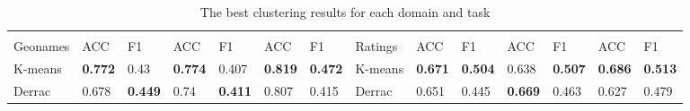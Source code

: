 \begin{landscape}
\begin{table}[]
\begin{tabular}{llllllllllllll}
&                                 &                                 &                                 &                                 &                                 &                                 &                                &                                 &                                 &                                 &                                 &                                 &                            \\
Geonames    & ACC                             & F1                              & ACC                             & F1                              & ACC                             & F1                              & Ratings                        & ACC                             & F1                              & ACC                             & F1                              & ACC                             & F1                       \\
\toprule
K-means     & \textbf{0.772} & 0.43                            & \textbf{0.774} & 0.407                           & \textbf{0.819} & \textbf{0.472} & K-means                        & \textbf{0.671} & \textbf{0.504} & 0.638                           & \textbf{0.507} & \textbf{0.686} & \textbf{0.513}       \\

Derrac      & 0.678                           & \textbf{0.449} & 0.74                            & \textbf{0.411} & 0.807                           & 0.415                           & Derrac                         & 0.651                           & 0.445                           & \textbf{0.669} & 0.463                           & 0.627                           & 0.479                 
	\end{tabular}
\centering
\caption{The best clustering results for each domain and task}
\end{table}
\end{landscape}




